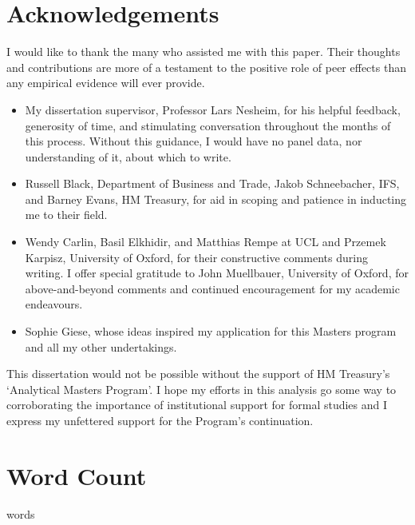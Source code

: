 \section*{Acknowledgements}

I would like to thank the many who assisted me with this paper.
Their thoughts and contributions are more of a testament to the positive
role of peer effects than any empirical evidence will ever provide.
\begin{itemize}
    \item[] My dissertation supervisor, Professor Lars Nesheim,
        for his helpful feedback, generosity of time,
        and stimulating conversation throughout the months of this process.
        Without this guidance, I would have no panel data,
        nor understanding of it, about which to write.
    \item[] Russell Black, Department of Business and Trade,
        Jakob Schneebacher, IFS, and Barney Evans, HM Treasury,
        for aid in scoping and patience in inducting me to their field.
    \item[] Wendy Carlin, Basil Elkhidir, and Matthias Rempe at UCL
        and Przemek Karpisz, University of Oxford,
        for their constructive comments during writing. 
        I offer special gratitude to John Muellbauer, University of Oxford,
        for above-and-beyond comments and continued
        encouragement for my academic endeavours.
    \item[] Sophie Giese, whose ideas inspired my application
        for this Masters program and all my other undertakings.
\end{itemize}
This dissertation would not be possible without the support
of HM Treasury's `Analytical Masters Program'.
I hope my efforts in this analysis go some way
to corroborating the importance of
institutional support for formal studies
and I express my unfettered support for the Program's continuation.

\vfill

\section*{Word Count}
\begin{center}
    words
\end{center}